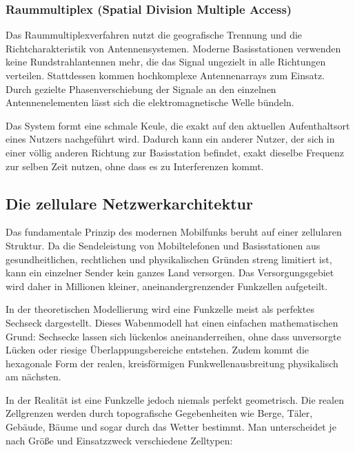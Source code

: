 \documentclass[11pt,a4paper]{article}
\begin{document}
\subsubsection{Raummultiplex (Spatial Division Multiple Access)}
Das Raummultiplexverfahren nutzt die geografische Trennung und die Richtcharakteristik von Antennensystemen. Moderne Basisstationen verwenden keine Rundstrahlantennen mehr, die das Signal ungezielt in alle Richtungen verteilen. Stattdessen kommen hochkomplexe Antennenarrays zum Einsatz. Durch gezielte Phasenverschiebung der Signale an den einzelnen Antennenelementen lässt sich die elektromagnetische Welle bündeln. 

Das System formt eine schmale Keule, die exakt auf den aktuellen Aufenthaltsort eines Nutzers nachgeführt wird. Dadurch kann ein anderer Nutzer, der sich in einer völlig anderen Richtung zur Basisstation befindet, exakt dieselbe Frequenz zur selben Zeit nutzen, ohne dass es zu Interferenzen kommt.

\subsection{Die zellulare Netzwerkarchitektur}

Das fundamentale Prinzip des modernen Mobilfunks beruht auf einer zellularen Struktur. Da die Sendeleistung von Mobiltelefonen und Basisstationen aus gesundheitlichen, rechtlichen und physikalischen Gründen streng limitiert ist, kann ein einzelner Sender kein ganzes Land versorgen. Das Versorgungsgebiet wird daher in Millionen kleiner, aneinandergrenzender Funkzellen aufgeteilt.

In der theoretischen Modellierung wird eine Funkzelle meist als perfektes Sechseck dargestellt. Dieses Wabenmodell hat einen einfachen mathematischen Grund: Sechsecke lassen sich lückenlos aneinanderreihen, ohne dass unversorgte Lücken oder riesige Überlappungsbereiche entstehen. Zudem kommt die hexagonale Form der realen, kreisförmigen Funkwellenausbreitung physikalisch am nächsten.

In der Realität ist eine Funkzelle jedoch niemals perfekt geometrisch. Die realen Zellgrenzen werden durch topografische Gegebenheiten wie Berge, Täler, Gebäude, Bäume und sogar durch das Wetter bestimmt. Man unterscheidet je nach Größe und Einsatzzweck verschiedene Zelltypen:
\end{document}
